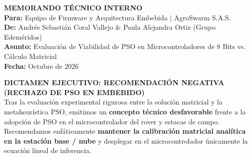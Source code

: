 \documentclass[12pt,a4paper]{article}
\begin{document}
\begin{p3highlight}
\textbf{MEMORANDO TÉCNICO INTERNO} \\
\textbf{Para:} Equipo de Firmware y Arquitectura Embebida $|$ AgroSwarm S.A.S. \\
\textbf{De:} Andrés Sebastián Coral Vallejo \& Paula Alejandra Ortiz (Grupo Edeméridos) \\
\textbf{Asunto:} Evaluación de Viabilidad de PSO en Microcontroladores de 8 Bits vs. Cálculo Matricial \\
\textbf{Fecha:} Octubre de 2026

\textbf{DICTAMEN EJECUTIVO: RECOMENDACIÓN NEGATIVA (RECHAZO DE PSO EN EMBEBIDO)} \\
Tras la evaluación experimental rigurosa entre la solución matricial y la metaheurística PSO, emitimos un \textbf{concepto técnico desfavorable} frente a la adopción de PSO en el microcontrolador del rover y estacas de campo. Recomendamos enfáticamente \textbf{mantener la calibración matricial analítica en la estación base / nube} y desplegar en el microcontrolador únicamente la ecuación lineal de inferencia.


\end{p3highlight}
\end{document}
